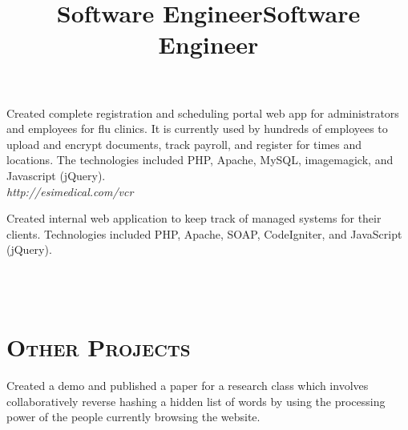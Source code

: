 \begin{resume}
\title{Software Engineer}
\begin{position}
Created complete registration and scheduling portal web app for administrators
and employees for flu clinics. It is currently used by hundreds of employees to
upload and encrypt documents, track payroll, and register for times and
locations. The technologies included PHP, Apache, MySQL, imagemagick, and
Javascript (jQuery).
\\ {\itshape http://esimedical.com/vcr}
\end{position}

\title{Software Engineer}
\begin{position}
Created internal web application to keep track of managed systems for their
clients. Technologies included PHP, Apache, SOAP, CodeIgniter, and JavaScript
(jQuery).
\end{position}



\begin{formatb}
  \\
  \body\\
\end{formatb}

\section{\textsc{Other Projects}}

\begin{position}
Created a demo and published a paper for a research class which involves
collaboratively reverse hashing a hidden list of words by using the processing
power of the people currently browsing the website. \\
\end{position}


\end{resume}
